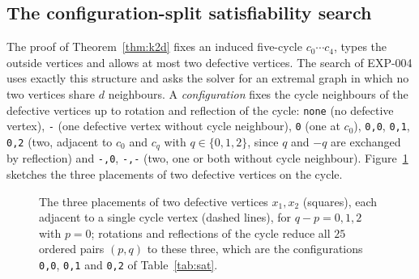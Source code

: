 \documentclass[11pt]{article}
\theoremstyle{remark}
\begin{document}
\subsection{The configuration-split satisfiability search}\label{sec:satenc}

The proof of Theorem~\ref{thm:k2d} fixes an induced five-cycle $c_0\cdots c_4$, types the outside vertices and allows at most two defective vertices. The search of EXP-004 uses exactly this structure and asks the solver for an extremal graph in which no two vertices share $d$ neighbours. A \emph{configuration} fixes the cycle neighbours of the defective vertices up to rotation and reflection of the cycle: \texttt{none} (no defective vertex), \texttt{-} (one defective vertex without cycle neighbour), \texttt{0} (one at $c_0$), \texttt{0,0}, \texttt{0,1}, \texttt{0,2} (two, adjacent to $c_0$ and $c_q$ with $q\in\{0,1,2\}$, since $q$ and $-q$ are exchanged by reflection) and \texttt{-,0}, \texttt{-,-} (two, one or both without cycle neighbour). Figure~\ref{fig:config} sketches the three placements of two defective vertices on the cycle.

\begin{figure}[ht]
\centering
{}
\caption{The three placements of two defective vertices $x_1,x_2$ (squares), each adjacent to a single cycle vertex (dashed lines), for $q-p=0,1,2$ with $p=0$; rotations and reflections of the cycle reduce all $25$ ordered pairs $(p,q)$ to these three, which are the configurations \texttt{0,0}, \texttt{0,1} and \texttt{0,2} of Table~\ref{tab:sat}.}
\label{fig:config}
\end{figure}
\end{document}
